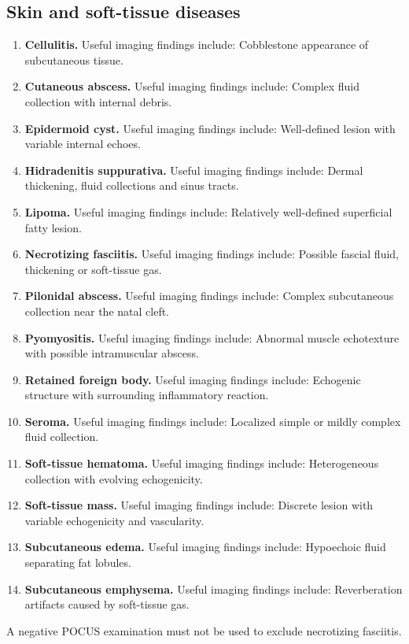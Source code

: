 \subsection{Skin and soft-tissue diseases}
\begin{enumerate}[leftmargin=*,itemsep=0.45em,topsep=0.4em]
\item \textbf{Cellulitis.} Useful imaging findings include: Cobblestone appearance of subcutaneous tissue.
\item \textbf{Cutaneous abscess.} Useful imaging findings include: Complex fluid collection with internal debris.
\item \textbf{Epidermoid cyst.} Useful imaging findings include: Well-defined lesion with variable internal echoes.
\item \textbf{Hidradenitis suppurativa.} Useful imaging findings include: Dermal thickening, fluid collections and sinus tracts.
\item \textbf{Lipoma.} Useful imaging findings include: Relatively well-defined superficial fatty lesion.
\item \textbf{Necrotizing fasciitis.} Useful imaging findings include: Possible fascial fluid, thickening or soft-tissue gas.
\item \textbf{Pilonidal abscess.} Useful imaging findings include: Complex subcutaneous collection near the natal cleft.
\item \textbf{Pyomyositis.} Useful imaging findings include: Abnormal muscle echotexture with possible intramuscular abscess.
\item \textbf{Retained foreign body.} Useful imaging findings include: Echogenic structure with surrounding inflammatory reaction.
\item \textbf{Seroma.} Useful imaging findings include: Localized simple or mildly complex fluid collection.
\item \textbf{Soft-tissue hematoma.} Useful imaging findings include: Heterogeneous collection with evolving echogenicity.
\item \textbf{Soft-tissue mass.} Useful imaging findings include: Discrete lesion with variable echogenicity and vascularity.
\item \textbf{Subcutaneous edema.} Useful imaging findings include: Hypoechoic fluid separating fat lobules.
\item \textbf{Subcutaneous emphysema.} Useful imaging findings include: Reverberation artifacts caused by soft-tissue gas.
\end{enumerate}
A negative POCUS examination must not be used to exclude necrotizing fasciitis.

